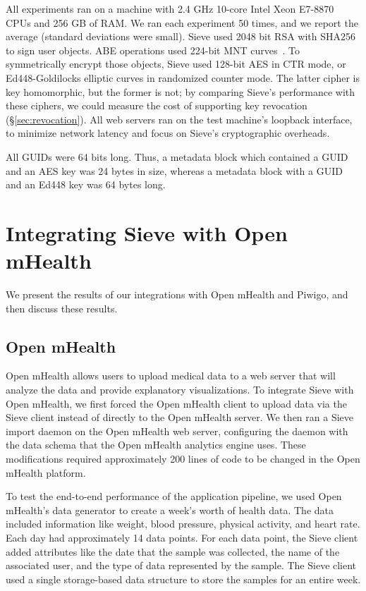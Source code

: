 All experiments ran on a machine with 2.4 GHz 10-core
Intel Xeon E7-8870 CPUs and 256 GB of RAM. We ran each
experiment 50 times, and we report the average
(standard deviations were small).
Sieve used 2048 bit RSA with SHA256 to sign
user objects. ABE operations used 224-bit MNT
curves~\cite{mnt224}. To symmetrically encrypt
those objects, Sieve used 128-bit AES in CTR
mode, or Ed448-Goldilocks elliptic curves in
randomized counter mode. The latter cipher is
key homomorphic, but the former is not; by
comparing Sieve's performance with these ciphers,
we could measure the cost of supporting key
revocation (\S\ref{sec:revocation}). All web
servers ran on the test machine's loopback
interface, to minimize network latency and
focus on Sieve's cryptographic overheads.

All GUIDs were 64 bits long. Thus, a metadata
block which contained a GUID and an AES key
was 24 bytes in size, whereas a metadata block
with a GUID and an Ed448 key was 64 bytes long.

\section{Integrating Sieve with Open mHealth}
\label{sec:integration}
We present the results of our integrations
with Open mHealth and Piwigo, and then discuss
these results.

\subsection{Open mHealth}
Open mHealth allows users to upload medical
data to a web server that will analyze the
data and provide explanatory visualizations.
To integrate Sieve with Open mHealth, we first 
forced the Open mHealth
client to upload data via the Sieve client
instead of directly to the Open mHealth server.
We then ran a Sieve import daemon on the Open
mHealth web server, configuring the daemon
with the data schema that the Open mHealth
analytics engine uses. These modifications
required approximately 200 lines of code
to be changed in the Open mHealth platform.

To test the end-to-end performance of the
application pipeline, we used Open mHealth's
data generator to create a week's worth of
health data. The data included information
like weight, blood pressure, physical activity,
and heart rate. Each day had approximately
14 data points. For each data point, the
Sieve client added attributes like the
date that the sample was collected, the
name of the associated user, and the type
of data represented by the sample. The Sieve
client used a single storage-based data 
structure to store the samples for an entire week.

